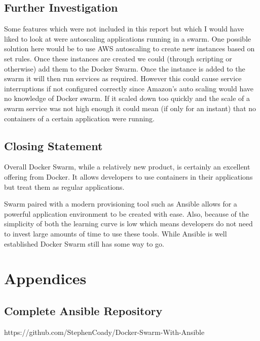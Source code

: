 \documentclass{article}
\begin{document}
\subsection{Further Investigation}
Some features which were not included in this report but which I would have liked to look at were autoscaling applications running in a swarm. One possible solution here would be to use AWS autoscaling to create new instances based on set rules. Once these instances are created we could (through scripting or otherwise) add them to the Docker Swarm. Once the instance is added to the swarm it will then run services as required. However this could cause service interruptions if not configured correctly since Amazon's auto scaling would have no knowledge of Docker swarm. If it scaled down too quickly and the scale of a swarm service was not high enough it could mean (if only for an instant) that no containers of a certain application were running. 


\subsection{Closing Statement}
Overall Docker Swarm, while a relatively new product, is certainly an excellent offering from Docker. It allows developers to use containers in their applications but treat them as regular applications.

Swarm paired with a modern provisioning tool such as Ansible allows for a powerful application environment to be created with ease. Also, because of the simplicity of both the learning curve is low which means developers do not need to invest large amounts of time to use these tools. While Ansible is well established Docker Swarm still has some way to go. 



\newpage
\appendix
\section*{Appendices}
\renewcommand{\thesubsection}{\Alph{subsection}}

\subsection{Complete Ansible Repository}
\label{appendix:code}
https://github.com/StephenCoady/Docker-Swarm-With-Ansible


\newpage

\end{document}
